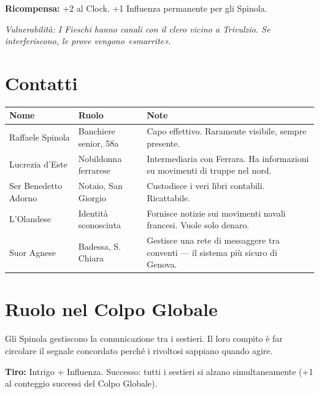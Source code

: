 
\textbf{Ricompensa:} +2 al Clock. +1 Influenza permanente per gli Spinola.

\textit{Vulnerabilità: I Fieschi hanno canali con il clero vicino a Trivulzio.
Se interferiscono, le prove vengono «smarrite».}

\section{Contatti}


\begin{center}
\begin{tabularx}{\textwidth}{L{2.8cm} L{2.8cm} X}
  \toprule
  \textbf{Nome} & \textbf{Ruolo} & \textbf{Note} \\
  \midrule
  Raffaele Spinola  & Banchiere senior, 58a   & Capo effettivo. Raramente visibile, sempre presente. \\
  Lucrezia d'Este   & Nobildonna ferrarese    & Intermediaria con Ferrara. Ha informazioni su movimenti di truppe nel nord. \\
  Ser Benedetto Adorno & Notaio, San Giorgio & Custodisce i veri libri contabili. Ricattabile. \\
  L'Olandese        & Identità sconosciuta    & Fornisce notizie sui movimenti navali francesi. Vuole solo denaro. \\
  Suor Agnese       & Badessa, S. Chiara      & Gestisce una rete di messaggere tra conventi — il sistema più sicuro di Genova. \\
  \bottomrule
\end{tabularx}
\end{center}

\section{Ruolo nel Colpo Globale}

Gli Spinola gestiscono la comunicazione tra i sestieri. Il loro compito è
far circolare il segnale concordato perché i rivoltosi sappiano quando agire.

\textbf{Tiro:} Intrigo + Influenza. Successo: tutti i sestieri si alzano
simultaneamente (+1 al conteggio successi del Colpo Globale).

